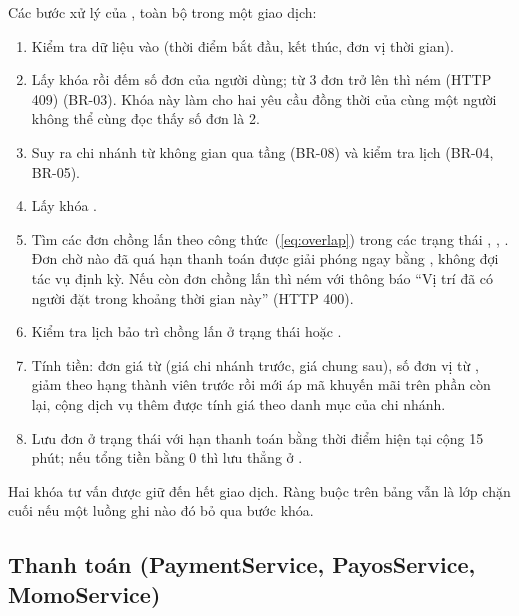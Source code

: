 Các bước xử lý của , toàn bộ trong một giao dịch:
\begin{enumerate}
    \item Kiểm tra dữ liệu vào (thời điểm bắt đầu, kết thúc, đơn vị thời gian).
    \item Lấy khóa  rồi đếm số đơn  của người dùng; từ 3 đơn trở lên thì ném  (HTTP 409) (BR-03). Khóa này làm cho hai yêu cầu đồng thời của cùng một người không thể cùng đọc thấy số đơn là 2.
    \item Suy ra chi nhánh từ không gian qua tầng (BR-08) và kiểm tra lịch (BR-04, BR-05).
    \item Lấy khóa .
    \item Tìm các đơn chồng lấn theo công thức~(\ref{eq:overlap}) trong các trạng thái , , . Đơn chờ nào đã quá hạn thanh toán được giải phóng ngay bằng , không đợi tác vụ định kỳ. Nếu còn đơn chồng lấn thì ném  với thông báo ``Vị trí đã có người đặt trong khoảng thời gian này'' (HTTP 400).
    \item Kiểm tra lịch bảo trì chồng lấn ở trạng thái  hoặc .
    \item Tính tiền: đơn giá từ  (giá chi nhánh trước, giá chung sau), số đơn vị từ , giảm theo hạng thành viên trước rồi mới áp mã khuyến mãi trên phần còn lại, cộng dịch vụ thêm được tính giá theo danh mục của chi nhánh.
    \item Lưu đơn ở trạng thái  với hạn thanh toán bằng thời điểm hiện tại cộng 15 phút; nếu tổng tiền bằng 0 thì lưu thẳng ở .
\end{enumerate}
Hai khóa tư vấn được giữ đến hết giao dịch. Ràng buộc  trên bảng  vẫn là lớp chặn cuối nếu một luồng ghi nào đó bỏ qua bước khóa.

\subsection{Thanh toán (PaymentService, PayosService, MomoService)}

